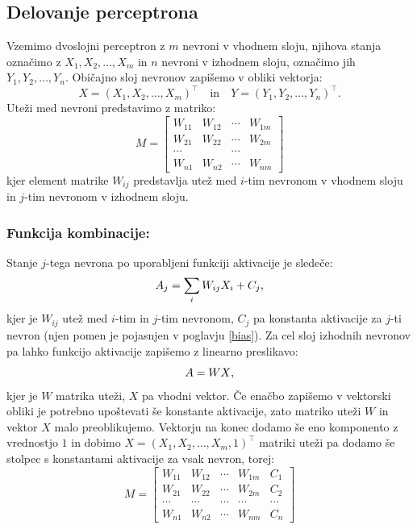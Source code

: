 \documentclass[mat1]{fmfdelo}
\begin{document}
\subsection{Delovanje perceptrona}
Vzemimo dvoslojni perceptron z $m$ nevroni v vhodnem sloju, njihova stanja  označimo z $X_1, X_2, \ldots, X_m$ in $n$ nevroni v izhodnem sloju, označimo jih $Y_1, Y_2, \ldots, Y_{n}$. Običajno sloj nevronov zapišemo v obliki vektorja:
%
\begin{equation*}
X = (X_1, X_2, \dotso, X_m)^\intercal  \quad \text{in} \quad  Y = (Y_1, Y_2, \dotso, Y_n)^\intercal \text{.}
\end{equation*}
%
Uteži med nevroni predstavimo z matriko:
%
\begin{equation*}
M = \begin{bmatrix}
W_{11} &W_{12}  & \cdots & W_{1m}  \\
W_{21}  &W_{22}  &\cdots & W_{2m}  \\
\cdots &  &\cdots &  \\
W_{n1} & W_{n2} & \cdots & W_{nm} 
\end{bmatrix}  
\end{equation*}
%
kjer element matrike $W_{ij}$ predstavlja utež med $i$-tim nevronom v vhodnem sloju in $j$-tim nevronom v izhodnem sloju.
%
\subsubsection{Funkcija kombinacije:}
Stanje $j$-tega nevrona po uporabljeni funkciji aktivacije je sledeče:
%
\begin{equation*}
A_j= \sum_{i}W_{ij}X_i + C_j \text,
\end{equation*}
%
kjer je $W_{ij}$ utež med $i$-tim in $j$-tim nevronom, $C_j$ pa konstanta aktivacije za $j$-ti nevron (njen pomen je pojasnjen v poglavju \ref{bias}). 
Za cel sloj izhodnih nevronov pa lahko funkcijo aktivacije zapišemo z linearno preslikavo:
%
\begin{equation*}
A = WX \text,
\end{equation*}
%
kjer je $W$ matrika uteži, $X$ pa vhodni vektor. Če enačbo zapišemo v vektorski obliki je potrebno upoštevati še konstante aktivacije, zato matriko uteži $W$ in vektor $X$ malo preoblikujemo. Vektorju na konec dodamo še eno komponento z vrednostjo $1$ in dobimo $X =  (X_1, X_2, \dotso, X_m, 1)^\intercal $ matriki uteži pa dodamo še stolpec s konstantami aktivacije za vsak nevron, torej: 
%
\begin{equation*}
M = \begin{bmatrix}
W_{11} &W_{12}  & \cdots & W_{1m}  & C_1\\
W_{21}  &W_{22}  &\cdots & W_{2m}  & C_2\\
\cdots &\cdots  &\cdots &\cdots  &\cdots\\
W_{n1} & W_{n2} & \cdots & W_{nm} & C_n
\end{bmatrix}  
\end{equation*}
%
\end{document}
